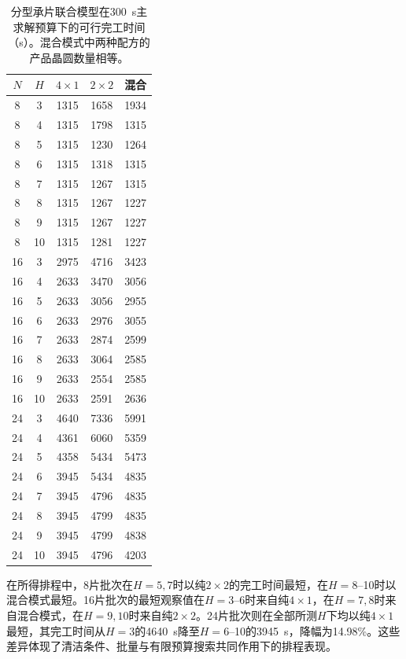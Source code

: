\documentclass[final,5p,times,twocolumn]{elsarticle}
\begin{document}
\begin{table}[!t]
\centering\scriptsize\setlength{\tabcolsep}{3pt}
\caption{分型承片联合模型在300~s主求解预算下的可行完工时间（s）。混合模式中两种配方的产品晶圆数量相等。}
\label{tab:joint-grid-cn}
\begin{tabular}{ccccc}\toprule
$N$ & $H$ & $4\times1$ & $2\times2$ & 混合\\\midrule
8 & 3 & 1315 & 1658 & 1934\\
8 & 4 & 1315 & 1798 & 1315\\
8 & 5 & 1315 & 1230 & 1264\\
8 & 6 & 1315 & 1318 & 1315\\
8 & 7 & 1315 & 1267 & 1315\\
8 & 8 & 1315 & 1267 & 1227\\
8 & 9 & 1315 & 1267 & 1227\\
8 & 10 & 1315 & 1281 & 1227\\
16 & 3 & 2975 & 4716 & 3423\\
16 & 4 & 2633 & 3470 & 3056\\
16 & 5 & 2633 & 3056 & 2955\\
16 & 6 & 2633 & 2976 & 3055\\
16 & 7 & 2633 & 2874 & 2599\\
16 & 8 & 2633 & 3064 & 2585\\
16 & 9 & 2633 & 2554 & 2585\\
16 & 10 & 2633 & 2591 & 2636\\
24 & 3 & 4640 & 7336 & 5991\\
24 & 4 & 4361 & 6060 & 5359\\
24 & 5 & 4358 & 5434 & 5473\\
24 & 6 & 3945 & 5434 & 4835\\
24 & 7 & 3945 & 4796 & 4835\\
24 & 8 & 3945 & 4799 & 4835\\
24 & 9 & 3945 & 4799 & 4838\\
24 & 10 & 3945 & 4796 & 4203\\
\bottomrule\end{tabular}\end{table}

在所得排程中，8片批次在$H=5,7$时以纯$2\times2$的完工时间最短，在$H=8$--10时以混合模式最短。16片批次的最短观察值在$H=3$--6时来自纯$4\times1$，在$H=7,8$时来自混合模式，在$H=9,10$时来自纯$2\times2$。24片批次则在全部所测$H$下均以纯$4\times1$最短，其完工时间从$H=3$的4640~s降至$H=6$--10的3945~s，降幅为14.98\%。这些差异体现了清洁条件、批量与有限预算搜索共同作用下的排程表现。
\end{document}
